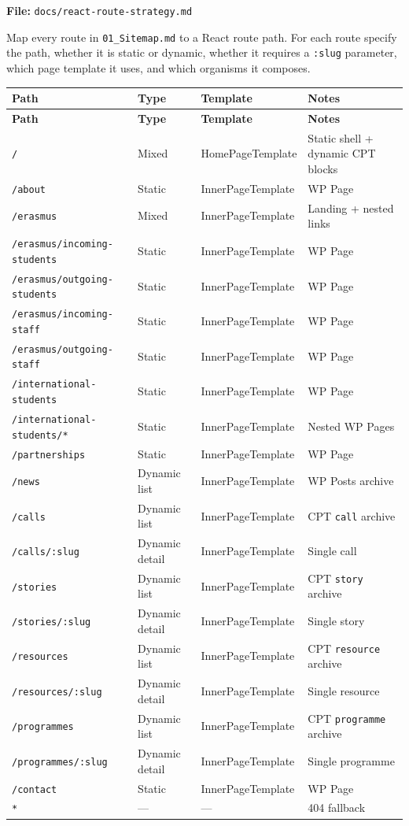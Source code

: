\documentclass[12pt,a4paper]{article}
\begin{document}
\textbf{File:} \texttt{docs/react-route-strategy.md}

Map every route in \texttt{01\_Sitemap.md} to a React route path. For each route specify
the path, whether it is static or dynamic, whether it requires a \texttt{:slug} parameter,
which page template it uses, and which organisms it composes.

\vspace{0.5em}
\begin{longtable}{@{}lllp{3.5cm}@{}}
\toprule
\rowcolor{uvtLightBlue}
\textbf{Path} & \textbf{Type} & \textbf{Template} & \textbf{Notes} \\
\midrule
\endfirsthead
\toprule
\rowcolor{uvtLightBlue}
\textbf{Path} & \textbf{Type} & \textbf{Template} & \textbf{Notes} \\
\midrule
\endhead
\bottomrule
\endfoot
\texttt{/} & Mixed & HomePageTemplate & Static shell + dynamic CPT blocks \\
\texttt{/about} & Static & InnerPageTemplate & WP Page \\
\texttt{/erasmus} & Mixed & InnerPageTemplate & Landing + nested links \\
\texttt{/erasmus/incoming-students} & Static & InnerPageTemplate & WP Page \\
\texttt{/erasmus/outgoing-students} & Static & InnerPageTemplate & WP Page \\
\texttt{/erasmus/incoming-staff} & Static & InnerPageTemplate & WP Page \\
\texttt{/erasmus/outgoing-staff} & Static & InnerPageTemplate & WP Page \\
\texttt{/international-students} & Static & InnerPageTemplate & WP Page \\
\texttt{/international-students/*} & Static & InnerPageTemplate & Nested WP Pages \\
\texttt{/partnerships} & Static & InnerPageTemplate & WP Page \\
\texttt{/news} & Dynamic list & InnerPageTemplate & WP Posts archive \\
\texttt{/calls} & Dynamic list & InnerPageTemplate & CPT \texttt{call} archive \\
\texttt{/calls/:slug} & Dynamic detail & InnerPageTemplate & Single call \\
\texttt{/stories} & Dynamic list & InnerPageTemplate & CPT \texttt{story} archive \\
\texttt{/stories/:slug} & Dynamic detail & InnerPageTemplate & Single story \\
\texttt{/resources} & Dynamic list & InnerPageTemplate & CPT \texttt{resource} archive \\
\texttt{/resources/:slug} & Dynamic detail & InnerPageTemplate & Single resource \\
\texttt{/programmes} & Dynamic list & InnerPageTemplate & CPT \texttt{programme} archive \\
\texttt{/programmes/:slug} & Dynamic detail & InnerPageTemplate & Single programme \\
\texttt{/contact} & Static & InnerPageTemplate & WP Page \\
\texttt{*} & --- & --- & 404 fallback \\
\end{longtable}
\end{document}
